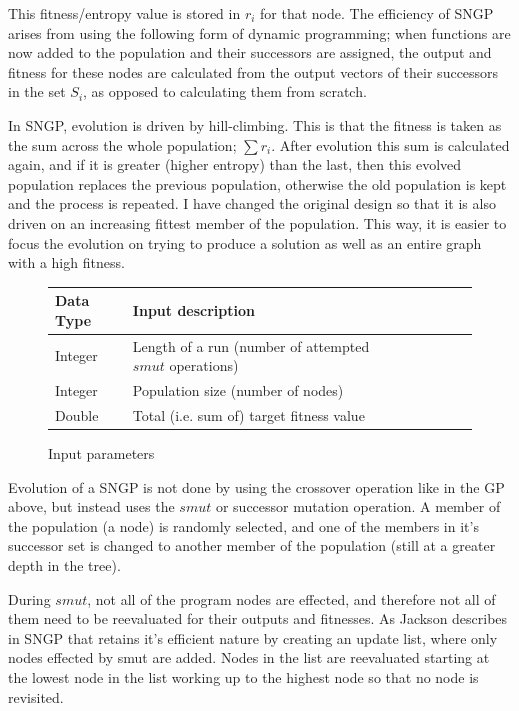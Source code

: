 \documentclass[a4paper,10.5pt]{article}
\begin{document}
This fitness/entropy value is stored in $r_i$ for that node. The efficiency of SNGP arises from using the following form of dynamic programming; when functions are now added to the population and their successors are assigned, the output and fitness for these nodes are calculated from the output vectors of their successors in the set $S_i$, as opposed to calculating them from scratch.

In SNGP, evolution is driven by hill-climbing. This is that the fitness is taken as the sum across the whole population; $\sum r_i$. After evolution this sum is calculated again, and if it is greater (higher entropy) than the last, then this evolved population replaces the previous population, otherwise the old population is kept and the process is repeated. I have changed the original design so that it is also driven on an increasing fittest member of the population. This way, it is easier to focus the evolution on trying to produce a solution as well as an entire graph with a high fitness. 

\begin{figure}[H]
\centering
\caption{Input parameters}
\label{inputparamsngp}
\begin{tabular}{l*{6}{l}r}
Data Type             & Input description\\
\hline
Integer & Length of a run (number of attempted $smut$ operations)\\
Integer & Population size (number of nodes)\\
Double & Total (i.e. sum of) target fitness value\\
\end{tabular}
\end{figure}

Evolution of a SNGP is not done by using the crossover operation like in the GP above, but instead uses the $smut$ or successor mutation operation. A member of the population (a node) is randomly selected, and one of the members in it's successor set is changed to another member of the population (still at a greater depth in the tree). 

During $smut$, not all of the program nodes are effected, and therefore not all of them need to be reevaluated for their outputs and fitnesses. As Jackson describes in \cite[p.53]{jacksonsngp} SNGP that retains it's efficient nature by creating an update list, where only nodes effected by smut are added. Nodes in the list are reevaluated starting at the lowest node in the list working up to the highest node so that no node is revisited.
\end{document}
